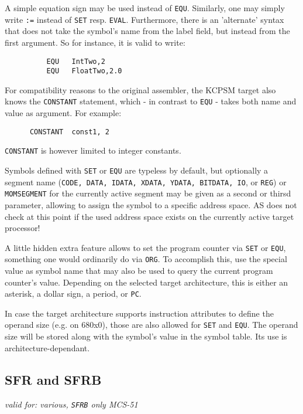 \documentclass[12pt,twoside]{report}
\makeatletter
\newcommand{\tty}[1]{{\tt #1}}
\newcommand{\ttindex}[1]{\index{#1@{\tt #1}}}
\makeatother
\begin{document}
A simple equation sign may be used instead of \tty{EQU}.  Similarly, one
may simply write \tty{:=} instead of \tty{SET} resp. \tty{EVAL}.
Furthermore, there is an 'alternate' syntax that does not take
the symbol's name from the label field, but instead from the
first argument.  So for instance, it is valid to write:
\begin{verbatim}
          EQU   IntTwo,2
          EQU   FloatTwo,2.0
\end{verbatim}

For compatibility reasons to the original assembler, the KCPSM target also
knows the {\tt CONSTANT} statement, which - in contrast to \tty{EQU} -
takes both name and value as argument.  For example:
\begin{verbatim}
      CONSTANT  const1, 2
\end{verbatim}
{\tt CONSTANT} is however limited to integer constants.

Symbols defined with \tty{SET} or \tty{EQU} are typeless by default, but
optionally a segment name (\tty{CODE, DATA, IDATA, XDATA, YDATA, BITDATA,
IO}, or \tty{REG}) or \tty{MOMSEGMENT} for the currently active segment
may be given as a second or thirsd parameter, allowing to assign the symbol to a
specific address space.  AS does not check at this point if the used
address space exists on the currently active target processor!

A little hidden extra feature allows to set the program counter via
\tty{SET} or \tty{EQU}, something one would ordinarily do via \tty{ORG}.
To accomplish this, use the special value as symbol name that may also
be used to query the current program counter's value.  Depending on the
selected target architecture, this is either an asterisk, a dollar sign,
a period, or \tty{PC}.

In case the target architecture supports instruction attributes to define
the operand size (e.g. on 680x0), those are also allowed for \tty{SET} and
\tty{EQU}.  The operand size will be stored along with the symbol's value in
the symbol table.  Its use is architecture-dependant.


\subsection{SFR and SFRB}
\ttindex{SFR}\ttindex{SFRB}

{\em valid for: various, \tty{SFRB} only MCS-51}
\end{document}
